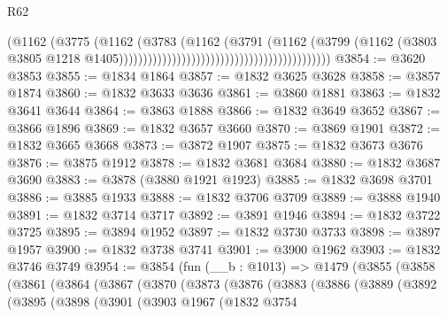 \begin{lexlean}{R62}
\begin{coremodule}
                                                                        (@1162
                                                                          (@3775
                                                                            (@1162
                                                                              (@3783
                                                                                (@1162
                                                                                  (@3791
                                                                                    (@1162
                                                                                      (@3799
                                                                                        (@1162
                                                                                          (@3803
                                                                                            @3805
                                                                                            @1218
                                                                                            @1405))))))))))))))))))))))))))))))))))))))))))))
@3854 := @3620 @3853
@3855 := @1834 @1864
@3857 := @1832 @3625 @3628
@3858 := @3857 @1874
@3860 := @1832 @3633 @3636
@3861 := @3860 @1881
@3863 := @1832 @3641 @3644
@3864 := @3863 @1888
@3866 := @1832 @3649 @3652
@3867 := @3866 @1896
@3869 := @1832 @3657 @3660
@3870 := @3869 @1901
@3872 := @1832 @3665 @3668
@3873 := @3872 @1907
@3875 := @1832 @3673 @3676
@3876 := @3875 @1912
@3878 := @1832 @3681 @3684
@3880 := @1832 @3687 @3690
@3883 := @3878 (@3880 @1921 @1923)
@3885 := @1832 @3698 @3701
@3886 := @3885 @1933
@3888 := @1832 @3706 @3709
@3889 := @3888 @1940
@3891 := @1832 @3714 @3717
@3892 := @3891 @1946
@3894 := @1832 @3722 @3725
@3895 := @3894 @1952
@3897 := @1832 @3730 @3733
@3898 := @3897 @1957
@3900 := @1832 @3738 @3741
@3901 := @3900 @1962
@3903 := @1832 @3746 @3749
@3954 := @3854
    (fun (__b : @1013) =>
    @1479
      (@3855
        (@3858
          (@3861
            (@3864
              (@3867
                (@3870
                  (@3873
                    (@3876
                      (@3883
                        (@3886
                          (@3889
                            (@3892
                              (@3895
                                (@3898
                                  (@3901
                                    (@3903
                                      @1967
                                      (@1832
                                        @3754

\end{coremodule}
\end{lexlean}
